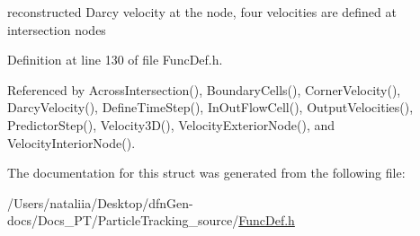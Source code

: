 reconstructed Darcy velocity at the node, four velocities are defined at intersection nodes 

Definition at line 130 of file Func\+Def.\+h.



Referenced by Across\+Intersection(), Boundary\+Cells(), Corner\+Velocity(), Darcy\+Velocity(), Define\+Time\+Step(), In\+Out\+Flow\+Cell(), Output\+Velocities(), Predictor\+Step(), Velocity3\+D(), Velocity\+Exterior\+Node(), and Velocity\+Interior\+Node().



The documentation for this struct was generated from the following file\+:\begin{DoxyCompactItemize}
\item 
/\+Users/nataliia/\+Desktop/dfn\+Gen-\/docs/\+Docs\+\_\+\+P\+T/\+Particle\+Tracking\+\_\+source/\mbox{\hyperlink{_func_def_8h}{Func\+Def.\+h}}\end{DoxyCompactItemize}
